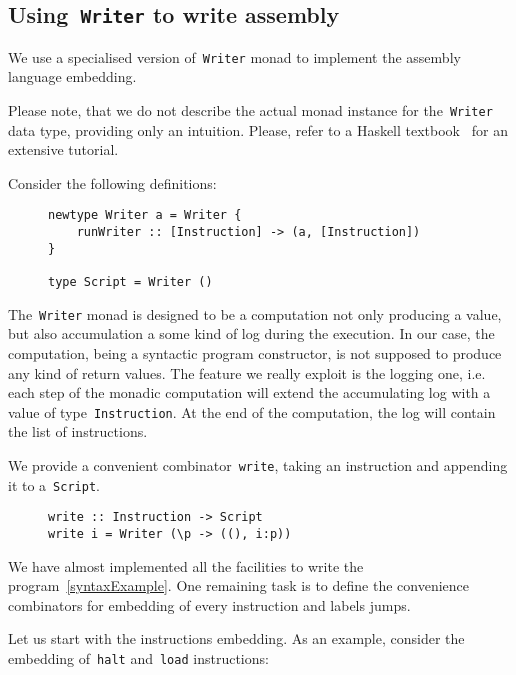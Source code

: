 \subsection{Using~\texttt{Writer} to write assembly}

We use a specialised version of~\texttt{Writer} monad
to implement the assembly language embedding.

Please note, that we do not describe the actual monad instance for
the~\texttt{Writer} data type, providing only an intuition.
Please, refer to a Haskell textbook~\cite{Lipovaca:2011:LYH:2018642} for an
extensive tutorial.

Consider the following definitions:

\begin{figure}[H]
\begin{verbatim}
newtype Writer a = Writer {
    runWriter :: [Instruction] -> (a, [Instruction])
}

type Script = Writer ()
\end{verbatim}
\end{figure}

The~\texttt{Writer} monad is designed to be a computation not only
producing a value, but also accumulation a some kind of log during the execution.
In our case, the computation, being a syntactic program constructor, is not supposed
to produce any kind of return values. The feature we really exploit is the logging one,
i.e. each step of the monadic computation will extend the accumulating log with a
value of type~\texttt{Instruction}. At the end of the computation,
the log will contain the list of instructions.

We provide a convenient combinator~\texttt{write}, taking an instruction
and appending it to a~\texttt{Script}.

\begin{figure}[H]
\begin{verbatim}
write :: Instruction -> Script
write i = Writer (\p -> ((), i:p))
\end{verbatim}
\end{figure}

We have almost implemented all the facilities to write the program~\ref{syntaxExample}.
One remaining task is to define the convenience combinators for embedding of every
instruction and labels jumps.

Let us start with the instructions embedding. As an example, consider the
embedding of~\texttt{halt} and~\texttt{load} instructions:

